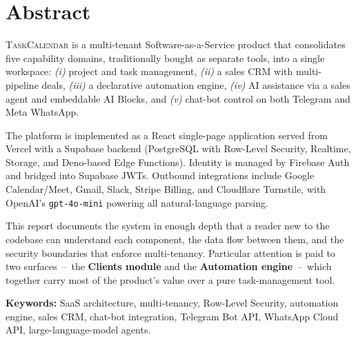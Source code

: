 \documentclass[11pt,a4paper,oneside]{article}
\newcommand{\tc}{\textsc{TaskCalendar}}
\newcommand{\code}[1]{\texttt{\small #1}}
\newcommand{\dash}{\,--\,}
\begin{document}
\thispagestyle{empty}
\section*{\color{accent}Abstract}

\noindent
\tc{} is a multi-tenant Software-as-a-Service product that
consolidates five capability domains, traditionally bought as separate
tools, into a single workspace: \emph{(i)} project and task
management, \emph{(ii)} a sales CRM with multi-pipeline deals,
\emph{(iii)} a declarative automation engine, \emph{(iv)} AI
assistance via a sales agent and embeddable AI Blocks, and \emph{(v)}
chat-bot control on both Telegram and Meta WhatsApp.

The platform is implemented as a React single-page application
served from Vercel with a Supabase backend (PostgreSQL with
Row-Level Security, Realtime, Storage, and Deno-based Edge
Functions). Identity is managed by Firebase Auth and bridged into
Supabase JWTs. Outbound integrations include Google Calendar/Meet,
Gmail, Slack, Stripe Billing, and Cloudflare Turnstile, with
OpenAI's \code{gpt-4o-mini} powering all natural-language parsing.

This report documents the system in enough depth that a reader new
to the codebase can understand each component, the data flow between
them, and the security boundaries that enforce multi-tenancy.
Particular attention is paid to two surfaces \dash{} the
\textbf{Clients module} and the \textbf{Automation engine} \dash{}
which together carry most of the product's value over a pure
task-management tool.

\vspace{0.6cm}
\noindent\textbf{Keywords:}
SaaS architecture, multi-tenancy, Row-Level Security, automation
engine, sales CRM, chat-bot integration, Telegram Bot API, WhatsApp
Cloud API, large-language-model agents.

\newpage
\tableofcontents
\vspace{1cm}
\listoffigures
\vspace{0.5cm}
\listoftables
\newpage

\end{document}
